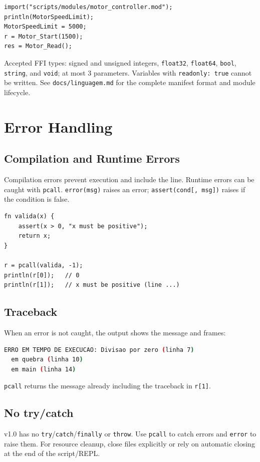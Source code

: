 \documentclass[11pt,a4paper,oneside]{report}
\newcommand{\code}[1]{\texttt{#1}}
\newcommand{\file}[1]{\texttt{#1}}
\begin{document}
\begin{lstlisting}
import("scripts/modules/motor_controller.mod");
println(MotorSpeedLimit);
MotorSpeedLimit = 5000;
r = Motor_Start(1500);
res = Motor_Read();
\end{lstlisting}

Accepted FFI types: signed and unsigned integers, \code{float32},
\code{float64}, \code{bool}, \code{string}, and \code{void}; at most 3
parameters. Variables with \code{readonly: true} cannot be written. See
\file{docs/linguagem.md} for the complete manifest format and module
lifecycle.

\chapter{Error Handling}
\label{cap:erros}

\section{Compilation and Runtime Errors}
Compilation errors prevent execution and include the line. Runtime errors
can be caught with \code{pcall}. \code{error(msg)} raises an error;
\code{assert(cond[, msg])} raises if the condition is false.

\begin{lstlisting}
fn valida(x) {
    assert(x > 0, "x must be positive");
    return x;
}

r = pcall(valida, -1);
println(r[0]);   // 0
println(r[1]);   // x must be positive (line ...)
\end{lstlisting}

\section{Traceback}
When an error is not caught, the output shows the message and frames:
\begin{lstlisting}[language=bash]
ERRO EM TEMPO DE EXECUCAO: Divisao por zero (linha 7)
  em quebra (linha 10)
  em main (linha 14)
\end{lstlisting}

\code{pcall} returns the message already including the traceback in
\code{r[1]}.

\section{No try/catch}
v1.0 has no \code{try}/\code{catch}/\code{finally} or \code{throw}.
Use \code{pcall} to catch errors and \code{error} to raise them. For
resource cleanup, close files explicitly or rely on automatic closing at
the end of the script/REPL.
\end{document}
